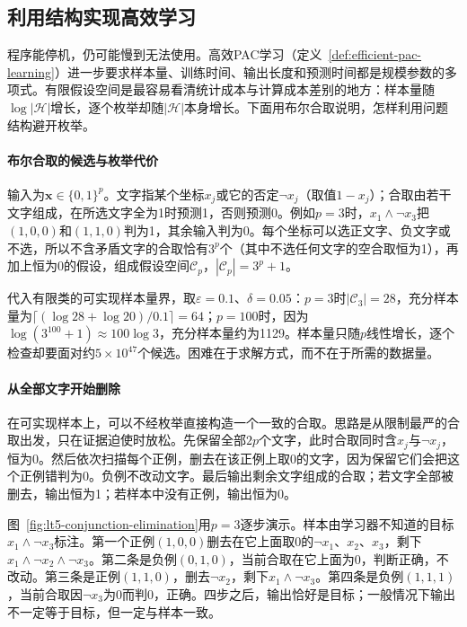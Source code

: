 \subsection{利用结构实现高效学习}
\label{sec:binary-efficient-structure}

程序能停机，仍可能慢到无法使用。高效PAC学习（定义~\ref{def:efficient-pac-learning}）进一步要求样本量、训练时间、输出长度和预测时间都是规模参数的多项式。有限假设空间是最容易看清统计成本与计算成本差别的地方：样本量随$\log|\mathcal H|$增长，逐个枚举却随$|\mathcal H|$本身增长。下面用布尔合取说明，怎样利用问题结构避开枚举。

\paragraph{布尔合取的候选与枚举代价}
输入为$\bm x\in\{0,1\}^p$。文字指某个坐标$x_j$或它的否定$\neg x_j$（取值$1-x_j$）；合取由若干文字组成，在所选文字全为1时预测1，否则预测0。例如$p=3$时，$x_1\wedge\neg x_3$把$(1,0,0)$和$(1,1,0)$判为1，其余输入判为0。每个坐标可以选正文字、负文字或不选，所以不含矛盾文字的合取恰有$3^p$个（其中不选任何文字的空合取恒为1），再加上恒为0的假设，组成假设空间$\mathcal C_p$，$|\mathcal C_p|=3^p+1$。

代入有限类的可实现样本量界，取$\varepsilon=0.1$、$\delta=0.05$：$p=3$时$|\mathcal C_3|=28$，充分样本量为$\lceil(\log28+\log20)/0.1\rceil=64$；$p=100$时，因为$\log(3^{100}+1)\approx100\log3$，充分样本量约为1129。样本量只随$p$线性增长，逐个检查却要面对约$5\times10^{47}$个候选。困难在于求解方式，而不在于所需的数据量。

\paragraph{从全部文字开始删除}
在可实现样本上，可以不经枚举直接构造一个一致的合取。思路是从限制最严的合取出发，只在证据迫使时放松。先保留全部$2p$个文字，此时合取同时含$x_j$与$\neg x_j$，恒为0。然后依次扫描每个正例，删去在该正例上取0的文字，因为保留它们会把这个正例错判为0。负例不改动文字。最后输出剩余文字组成的合取；若文字全部被删去，输出恒为1；若样本中没有正例，输出恒为0。

图~\ref{fig:lt5-conjunction-elimination}用$p=3$逐步演示。样本由学习器不知道的目标$x_1\wedge\neg x_3$标注。第一个正例$(1,0,0)$删去在它上面取0的$\neg x_1$、$x_2$、$x_3$，剩下$x_1\wedge\neg x_2\wedge\neg x_3$。第二条是负例$(0,1,0)$，当前合取在它上面为0，判断正确，不改动。第三条是正例$(1,1,0)$，删去$\neg x_2$，剩下$x_1\wedge\neg x_3$。第四条是负例$(1,1,1)$，当前合取因$\neg x_3$为0而判0，正确。四步之后，输出恰好是目标；一般情况下输出不一定等于目标，但一定与样本一致。

